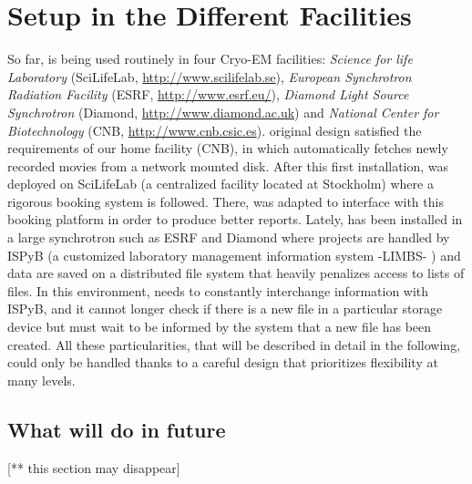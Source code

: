 \section{\scipion Setup in the Different Facilities}



So far, \scipion is being used routinely in four Cryo-EM facilities: \emph{Science for life Laboratory} (SciLifeLab, \url{http://www.scilifelab.se}),  \emph{European Synchrotron Radiation Facility} (ESRF, \url{http://www.esrf.eu/}), \emph{Diamond Light Source Synchrotron} (Diamond, \url{http://www.diamond.ac.uk}) and \emph{National Center for Biotechnology} (CNB, \url{http://www.cnb.csic.es}). \scipion original design satisfied the requirements of our home facility (CNB), in which \scipion automatically fetches newly recorded movies from a network mounted disk. After this first installation, \scipion was deployed on SciLifeLab (a centralized facility located at Stockholm) where a rigorous booking system is followed. There, \scipion was adapted to interface with this booking platform in order to produce better reports. Lately,  \scipion has been installed in a large synchrotron  such as ESRF and Diamond  where projects are handled by ISPyB (a customized laboratory management information system -LIMBS- \citep{Delageniere2011}) and data are saved on a distributed file system that heavily penalizes access to lists of files. In this environment, \scipion needs to constantly interchange information with ISPyB, and it cannot longer check if there is a new file in a particular storage device but must wait to be informed by the system that a new file has been created. All these particularities, that will be described in detail in the following, could only be handled thanks to a careful design that prioritizes flexibility at many levels. 










\subsection{What will do in future}
[** this section may disappear] 


